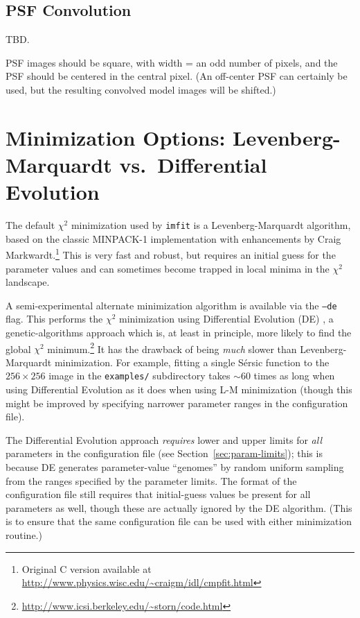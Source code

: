 \documentclass[10pt]{article}
\newcommand{\imfit}{\texttt{imfit}}
\begin{document}
\subsection{PSF Convolution}

TBD.

PSF images should be square, with width = an odd number of pixels, and
the PSF should be centered in the central pixel. (An off-center PSF can certainly
be used, but the resulting convolved model images will be shifted.)



\section{Minimization Options: Levenberg-Marquardt vs.\ Differential Evolution}

The default $\chi^2$ minimization  used by \imfit{} is a Levenberg-Marquardt
algorithm, based on the classic MINPACK-1 implementation with enhancements by
Craig Markwardt.\footnote{Original C version available at \url{http://www.physics.wisc.edu/~craigm/idl/cmpfit.html}}
This is very fast and robust, but requires an initial guess for the parameter
values and can sometimes
become trapped in local minima in the $\chi^2$ landscape.

A semi-experimental alternate minimization algorithm is available via the
\texttt{--de} flag. This performs the $\chi^2$ minimization using Differential
Evolution (DE) \citep{de}, a genetic-algorithms approach which is, at least in
principle, more likely to find the global $\chi^2$
minimum.\footnote{\url{http://www.icsi.berkeley.edu/~storn/code.html}} It has
the drawback of being \textit{much} slower than Levenberg-Marquardt
minimization. For example, fitting a single S\'ersic function to the $256
\times 256$ image in the \texttt{examples/} subdirectory takes $\sim 60$ times
as long when using Differential Evolution as it does when using L-M minimization
(though this might be improved by specifying narrower parameter ranges in the
configuration file).

The Differential Evolution approach \textit{requires} lower and upper limits for
\textit{all} parameters in the configuration file (see
Section~\ref{sec:param-limits}); this is because DE generates 
parameter-value ``genomes'' by random uniform sampling from the ranges specified
by the parameter limits. The format of the configuration file still requires
that initial-guess values be present for all parameters as well, though these
are actually ignored by the DE algorithm. (This is to ensure that the same
configuration file can be used with either minimization routine.)
\end{document}
